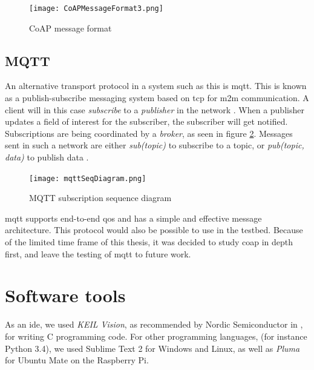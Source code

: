 \newpage
\begin{figure}[h!]
    \centering
    \texttt{[image: CoAPMessageFormat3.png]}    
    \caption{CoAP message format \cite{shelby2014constrained}}
    \label{fig:CoAPMessageFormat}
\end{figure}






\subsection{MQTT}

\noindent An alternative transport protocol in a system such as this is \gls{mqtt}. This is  known as a publish-subscribe messaging system based on \gls{tcp} for \gls{m2m} communication. A client will in this case \textit{subscribe} to a \textit{publisher} in the network \cite{hunkeler2008mqtt}. When a publisher updates a field of interest for the subscriber, the subscriber will get notified. Subscriptions are being coordinated by a \textit{broker}, as seen in figure \ref{fig:mqttSeqDiagram}. Messages sent in such a network are either \textit{sub(topic)} to subscribe to a topic, or \textit{pub(topic, data)} to publish data \cite{mqttWebsite}. 


\begin{figure}[ht]
    \centering
    \texttt{[image: mqttSeqDiagram.png]}    
    \caption{MQTT subscription sequence diagram \cite{hunkeler2008mqtt}}
    \label{fig:mqttSeqDiagram}
\end{figure}

\noindent \gls{mqtt} supports end-to-end \gls{qos} and has a simple and effective message architecture. This protocol would also be possible to use in the testbed. Because of the limited time frame of this thesis, it was decided to study \gls{coap} in depth first, and leave the testing of \gls{mqtt} to future work. 


\section{Software tools}

\noindent As an \gls{ide}, we used \textit{KEIL Vision}, as recommended by Nordic Semiconductor in \cite{nord}, for writing C programming code. For other programming languages, (for instance Python 3.4), we used Sublime Text 2 for Windows and Linux, as well as \textit{Pluma} for Ubuntu Mate on the Raspberry Pi. 

